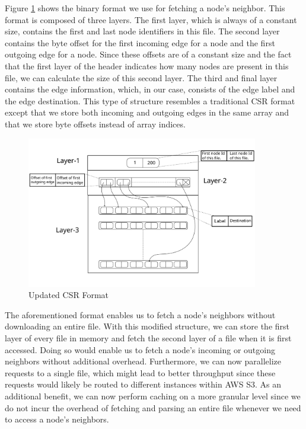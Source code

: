 \medskip
Figure \ref{fig:csrFormat} shows the binary format we use for fetching a
node's neighbor. This format is composed of three layers. The
first layer, which is always of a constant size, contains the first and last
node identifiers in this file. The second layer contains the byte offset
for the first incoming edge for a node and the first outgoing edge for a node.
Since these offsets are of a constant size and the fact that the first layer of
the header indicates how many nodes are present in this file, we can calculate
the size of this second layer. The third and final layer contains the edge
information, which, in our case, consists of the edge label and the edge
destination. This type of structure resembles a traditional CSR format
except that we store both incoming and outgoing edges in the same
array and that we store byte offsets instead of array indices.
\begin{figure}[ht]
    \centering
    \includegraphics[width=0.9\textwidth]{figures/csrFormat.png}
    \caption{Updated CSR Format}
    \label{fig:csrFormat}
\end{figure}

\medskip
The aforementioned format enables us to fetch a node's neighbors
without downloading an entire file. With this modified structure, we can
store the first layer of every file in memory and fetch the second layer of a
file when it is first accessed. Doing so would enable us to fetch a
node's incoming or outgoing neighbors without additional overhead.
Furthermore, we can now parallelize requests to a single file, which might lead
to better throughput since these requests would likely be routed to
different instances within AWS S3. As an additional benefit, we can now perform
caching on a more granular level since we do not incur the overhead of fetching
and parsing an entire file whenever we need to access a node's neighbors.

